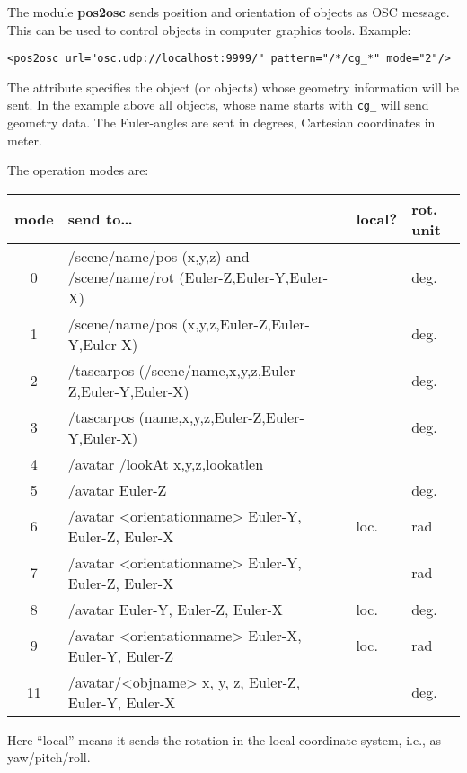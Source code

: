 The module {\bf pos2osc} sends position and orientation of \tascar{}
objects as OSC message. This can be used to control objects in
computer graphics tools. Example:
\begin{lstlisting}[numbers=none]
<pos2osc url="osc.udp://localhost:9999/" pattern="/*/cg_*" mode="2"/>
\end{lstlisting}
The  attribute specifies the object (or objects) whose geometry information will be sent.
%
In the example above all objects, whose name starts with \verb!cg_! will send geometry data.
%
The Euler-angles are sent in degrees, Cartesian coordinates in meter. 



The operation modes are:

{\small
\begin{tabular}{clll}
mode & send to\dots                                                          & local? & rot. unit \\
\hline
0    & /scene/name/pos (x,y,z) and /scene/name/rot (Euler-Z,Euler-Y,Euler-X) &        & deg.      \\
1    & /scene/name/pos (x,y,z,Euler-Z,Euler-Y,Euler-X)                       &        & deg.      \\
2    & /tascarpos (/scene/name,x,y,z,Euler-Z,Euler-Y,Euler-X)                &        & deg.      \\
3    & /tascarpos (name,x,y,z,Euler-Z,Euler-Y,Euler-X)                       &        & deg.      \\
4    & /avatar /lookAt x,y,z,lookatlen                                       &        &           \\
5    & /avatar Euler-Z                                                       &        & deg.      \\
6    & /avatar <orientationname> Euler-Y, Euler-Z, Euler-X                   & loc.   & rad       \\
7    & /avatar <orientationname> Euler-Y, Euler-Z, Euler-X                   &        & rad       \\
8    & /avatar Euler-Y, Euler-Z, Euler-X                                     & loc.   & deg.      \\
9    & /avatar <orientationname> Euler-X, Euler-Y, Euler-Z                   & loc.   & rad       \\
11   & /avatar/<objname> x, y, z, Euler-Z, Euler-Y, Euler-X                  &        & deg.      \\
\end{tabular}
}

Here ``local'' means it sends the rotation in the local coordinate system, i.e., as yaw/pitch/roll.
